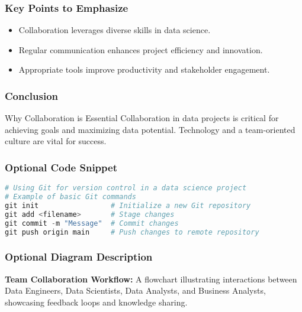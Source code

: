 \documentclass[aspectratio=169]{beamer}
\begin{document}
\begin{frame}[fragile]
    \frametitle{Key Points to Emphasize}
    \begin{itemize}
        \item Collaboration leverages diverse skills in data science.
        \item Regular communication enhances project efficiency and innovation.
        \item Appropriate tools improve productivity and stakeholder engagement.
    \end{itemize}
\end{frame}

\begin{frame}[fragile]
    \frametitle{Conclusion}
    \begin{block}{Why Collaboration is Essential}
        Collaboration in data projects is critical for achieving goals and maximizing data potential. Technology and a team-oriented culture are vital for success.
    \end{block}
\end{frame}

\begin{frame}[fragile]
    \frametitle{Optional Code Snippet}
    \begin{lstlisting}[language=Python]
# Using Git for version control in a data science project
# Example of basic Git commands
git init                 # Initialize a new Git repository
git add <filename>       # Stage changes
git commit -m "Message"  # Commit changes
git push origin main     # Push changes to remote repository
    \end{lstlisting}
\end{frame}

\begin{frame}[fragile]
    \frametitle{Optional Diagram Description}
    \textbf{Team Collaboration Workflow:} A flowchart illustrating interactions between Data Engineers, Data Scientists, Data Analysts, and Business Analysts, showcasing feedback loops and knowledge sharing.
\end{frame}
\end{document}
